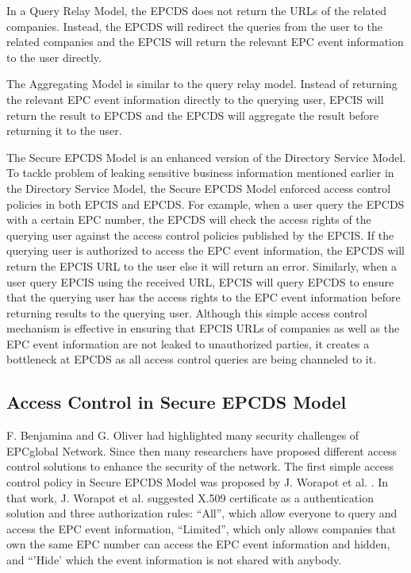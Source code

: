 \documentclass[conference]{IEEEtran}
\begin{document}
In a Query Relay Model, the EPCDS does not return the URLs of the related companies. Instead, the EPCDS will redirect the queries from the user to the related companies and the EPCIS will return the relevant EPC event information to the user directly.

The Aggregating Model is similar to the query relay model. Instead of returning the relevant EPC event information directly to the querying user, EPCIS will return the result to EPCDS and the EPCDS will aggregate the result before returning it to the user. 

The Secure EPCDS Model is an enhanced version of the Directory Service Model. To tackle problem of leaking sensitive business information mentioned earlier in the Directory Service Model, the Secure EPCDS Model enforced access control policies in both EPCIS and EPCDS. For example, when a user query the EPCDS with a certain EPC number, the EPCDS will check the access rights of the querying user against the access control policies published by the EPCIS. If the querying user is authorized to access the EPC event information, the EPCDS will return the EPCIS URL to the user else it will return an error. Similarly, when a user query EPCIS using the received URL, EPCIS will query EPCDS to ensure that the querying user has the access rights to the EPC event information before returning results to the querying user. Although this simple access control mechanism is effective in ensuring that EPCIS URLs of companies as well as the EPC event information are not leaked to unauthorized parties, it creates a bottleneck at EPCDS as all access control queries are being channeled to it.

\subsection {Access Control in Secure EPCDS Model}
F. Benjamina and G. Oliver \cite{ben:sec} had highlighted many security challenges of EPCglobal Network. Since then many researchers have proposed different access control solutions to enhance the security of the network. The first simple access control policy in Secure EPCDS Model was proposed by J. Worapot et al. \cite{wor:des}. In that work, J. Worapot et al. suggested X.509 certificate as a authentication solution and three authorization rules: ``All'', which allow everyone to query and access the EPC event information,  ``Limited'', which only allows companies that own the same EPC number can access the EPC event information and hidden, and ``'Hide' which the event information is not shared with anybody. 
\end{document}
